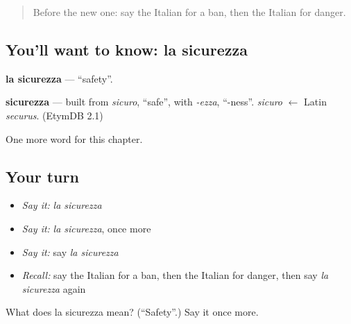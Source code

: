 \label{lesson:IT-C165-sicurezza}



\begin{quote}
Before the new one: say the Italian for a ban, then the Italian for danger.
\end{quote}

\subsection*{You'll want to know: la sicurezza}
\textbf{la sicurezza} — \textquotedblleft{}safety\textquotedblright{}.

\begin{cousinweb}
\textbf{sicurezza} — built from \emph{sicuro}, \textquotedblleft{}safe\textquotedblright{}, with \emph{-ezza}, \textquotedblleft{}-ness\textquotedblright{}. \emph{sicuro} $\leftarrow$ Latin \emph{securus}. (EtymDB 2.1)
\end{cousinweb}

\begin{grammarlens}[title={What you've built}]
One more word for this chapter.
\end{grammarlens}

\subsection*{Your turn}
\begin{itemize}
\raggedright
  \item \emph{Say it:} \emph{la sicurezza}
  \item \emph{Say it:} \emph{la sicurezza}, once more
  \item \emph{Say it:} say \emph{la sicurezza}
  \item \emph{Recall:} say the Italian for a ban, then the Italian for danger, then say \emph{la sicurezza} again
\end{itemize}

\begin{tcolorbox}[breakable,colback=teal!4,colframe=teal!35!black,title={Before you move on}]
What does la sicurezza mean? (\textquotedblleft{}Safety\textquotedblright{}.) Say it once more.
\end{tcolorbox}
